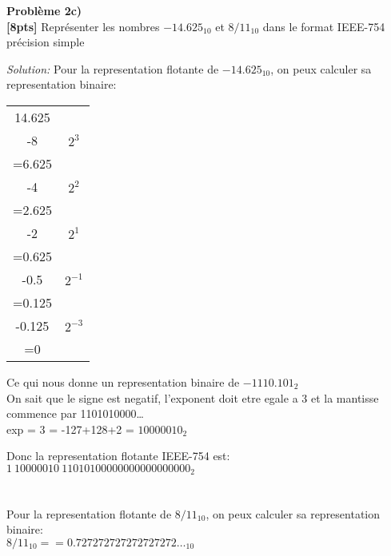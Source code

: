 \documentclass{article}
\newenvironment{problem}[2][Problème]
    { \begin{mdframed}[backgroundcolor=gray!20] \textbf{#1 #2} \\}
    {  \end{mdframed}}
\newenvironment{solution}
    {\textit{Solution:}}
    {}
\begin{document}
\begin{problem}{2c)}
\textbf{[8pts]} Représenter les nombres $-14.625_{10}$ et $8/11_{10}$ dans le format IEEE-754 précision simple
\end{problem}

\begin{solution}
    Pour la representation flotante de $-14.625_{10}$, on peux calculer sa representation binaire:\\
    \begin{tabular}{|c|c|}
        \hline
        14.625 \\
        -8 & $2^3$\\
        \hline
        =6.625 \\
        -4 & $2^2$\\ 
        \hline
        =2.625 \\ 
        -2 & $2^1$\\
        \hline
        =0.625\\ 
        -0.5 & $2^{-1}$\\ 
        \hline
        =0.125\\ 
        -0.125 & $2^{-3}$\\ 
        \hline
        =0\\ 
        \hline
    \end{tabular}
    Ce qui nous donne un representation binaire de $-1110.101_2$\\

    On sait que le signe est negatif, l'exponent doit etre egale a 3 et la mantisse commence par 1101010000\dots\\

    exp = 3 = -127+128+2 = $10000010_2$

    Donc la representation flotante IEEE-754 est: \\
    $1\ 10000010\ 11010100000000000000000_2$ \\\\\\

    Pour la representation flotante de $8/11_{10}$, on peux calculer sa representation binaire:\\
    $8/11_{10} == 0.727272727272727272\dots_{10}$


\end{solution}
\end{document}
